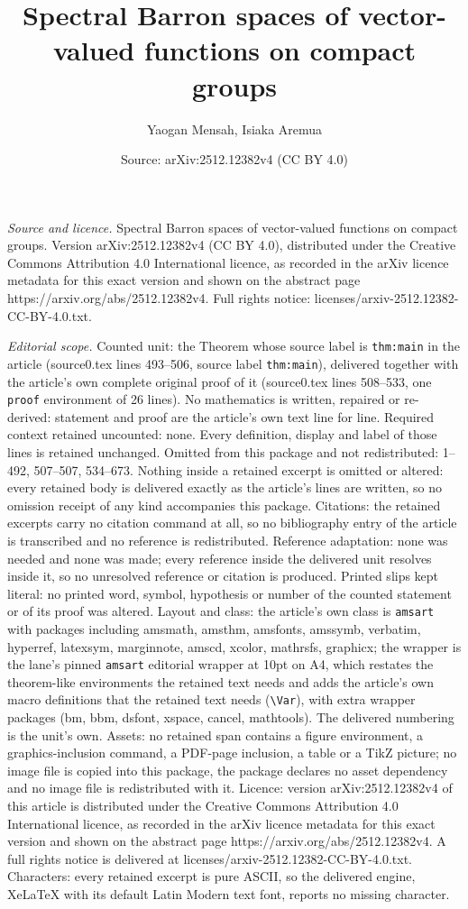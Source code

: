 \documentclass[10pt,a4paper]{amsart}
\title[Spectral Barron spaces of vector-valued functions on compact]{Spectral Barron spaces of vector-valued functions on compact groups}
\author{Yaogan Mensah, Isiaka Aremua}
\date{Source: arXiv:2512.12382v4 (CC BY 4.0)}
\begin{document}
\maketitle

\noindent\emph{Source and licence.} Spectral Barron spaces of vector-valued functions on compact groups. Version arXiv:2512.12382v4 (CC BY 4.0), distributed under the Creative Commons Attribution 4.0 International licence, as recorded in the arXiv licence metadata for this exact version and shown on the abstract page https://arxiv.org/abs/2512.12382v4. Full rights notice: licenses/arxiv-2512.12382-CC-BY-4.0.txt.\par\smallskip

\noindent\textit{Editorial scope.} Counted unit: the Theorem whose source label is \texttt{thm:main} in the article (source0.tex lines 493--506, source label \texttt{thm:main}), delivered together with the article's own complete original proof of it (source0.tex lines 508--533, one \texttt{proof} environment of 26 lines). No mathematics is written, repaired or re-derived: statement and proof are the article's own text line for line. Required context retained uncounted: none. Every definition, display and label of those lines is retained unchanged. Omitted from this package and not redistributed: 1--492, 507--507, 534--673. Nothing inside a retained excerpt is omitted or altered: every retained body is delivered exactly as the article's lines are written, so no omission receipt of any kind accompanies this package. Citations: the retained excerpts carry no citation command at all, so no bibliography entry of the article is transcribed and no reference is redistributed. Reference adaptation: none was needed and none was made; every reference inside the delivered unit resolves inside it, so no unresolved reference or citation is produced. Printed slips kept literal: no printed word, symbol, hypothesis or number of the counted statement or of its proof was altered. Layout and class: the article's own class is \texttt{amsart} with packages including amsmath, amsthm, amsfonts, amssymb, verbatim, hyperref, latexsym, marginnote, amscd, xcolor, mathrsfs, graphicx; the wrapper is the lane's pinned \texttt{amsart} editorial wrapper at 10pt on A4, which restates the theorem-like environments the retained text needs and adds the article's own macro definitions that the retained text needs (\texttt{\textbackslash Var}), with extra wrapper packages (bm, bbm, dsfont, xspace, cancel, mathtools). The delivered numbering is the unit's own. Assets: no retained span contains a figure environment, a graphics-inclusion command, a PDF-page inclusion, a table or a TikZ picture; no image file is copied into this package, the package declares no asset dependency and no image file is redistributed with it. Licence: version arXiv:2512.12382v4 of this article is distributed under the Creative Commons Attribution 4.0 International licence, as recorded in the arXiv licence metadata for this exact version and shown on the abstract page https://arxiv.org/abs/2512.12382v4. A full rights notice is delivered at licenses/arxiv-2512.12382-CC-BY-4.0.txt. Characters: every retained excerpt is pure ASCII, so the delivered engine, XeLaTeX with its default Latin Modern text font, reports no missing character.
\end{document}
